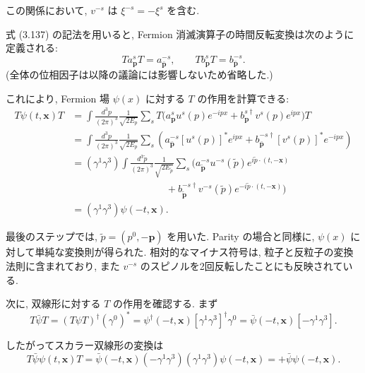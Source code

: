 \documentclass[a4paper,12pt]{article}
\begin{document}
この関係において, $v^{-s}$ は $\xi^{-s}=-\xi^s$ を含む.

式 (3.137) の記法を用いると, Fermion 消滅演算子の時間反転変換は次のように定義される:
\begin{equation}
Ta^s_{\mathbf{p}}T = a^{-s}_{\bar{\mathbf{p}}}, 
\qquad 
Tb^s_{\mathbf{p}}T = b^{-s}_{\bar{\mathbf{p}}}.
\tag{3.138}
\end{equation}
(全体の位相因子は以降の議論には影響しないため省略した.)

これにより, Fermion 場 $\psi(x)$ に対する $T$ の作用を計算できる:
\begin{align*}
T\psi(t,\mathbf{x})T 
&= \int \frac{d^3p}{(2\pi)^3}\frac{1}{\sqrt{2E_p}}
\sum_s T\Big( a^s_{\mathbf{p}} u^s(p)e^{-ipx} + b^{s\dagger}_{\mathbf{p}} v^s(p)e^{ipx} \Big) T \\
&= \int \frac{d^3p}{(2\pi)^3}\frac{1}{\sqrt{2E_p}}
\sum_s \left( a^{-s}_{\bar{\mathbf{p}}}[u^s(p)]^* e^{ipx}
+ b^{-s\dagger}_{\bar{\mathbf{p}}}[v^s(p)]^* e^{-ipx} \right) \\
&= (\gamma^1\gamma^3)\int \frac{d^3\tilde{p}}{(2\pi)^3}\frac{1}{\sqrt{2E_{\tilde{p}}}}
\sum_s \Big( a^{-s}_{\tilde{\mathbf{p}}}u^{-s}(\tilde{p})e^{i\tilde{p}\cdot(t,-\mathbf{x})} \\
&\hspace{4cm}
+ b^{-s\dagger}_{\tilde{\mathbf{p}}} v^{-s}(\tilde{p})e^{-i\tilde{p}\cdot(t,-\mathbf{x})} \Big) \\
&= (\gamma^1\gamma^3)\psi(-t,\mathbf{x}).
\tag{3.139}
\end{align*}

最後のステップでは, $\tilde{p}=(p^0,-\mathbf{p})$ を用いた.  
Parity の場合と同様に, $\psi(x)$ に対して単純な変換則が得られた.  
相対的なマイナス符号は, 粒子と反粒子の変換法則に含まれており, また $v^{-s}$ のスピノルを2回反転したことにも反映されている.

次に, 双線形に対する $T$ の作用を確認する.  
まず
\begin{equation*}
T\bar{\psi}T = (T\psi T)^\dagger(\gamma^0)^* 
= \psi^\dagger(-t,\mathbf{x})[\gamma^1\gamma^3]^\dagger\gamma^0 
= \bar{\psi}(-t,\mathbf{x})[-\gamma^1\gamma^3].
\tag{3.140}
\end{equation*}

したがってスカラー双線形の変換は
\begin{equation*}
T\bar{\psi}\psi(t,\mathbf{x})T 
= \bar{\psi}(-t,\mathbf{x})(-\gamma^1\gamma^3)(\gamma^1\gamma^3)\psi(-t,\mathbf{x}) 
= +\bar{\psi}\psi(-t,\mathbf{x}).
\tag{3.141}
\end{equation*}
\end{document}
